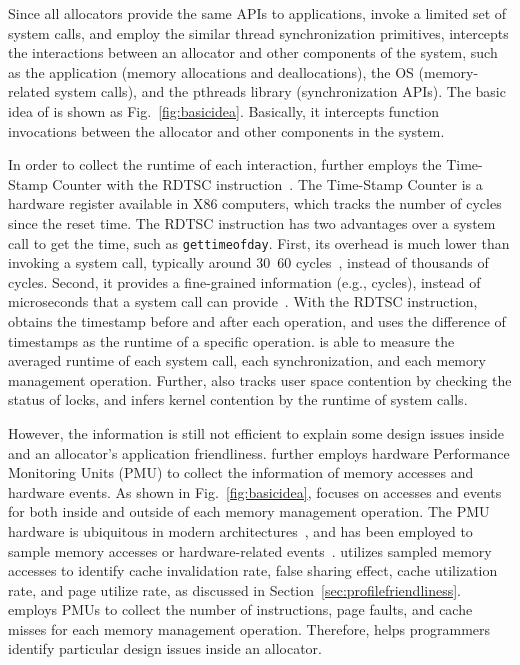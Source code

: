 Since all allocators provide the same APIs to applications, invoke a limited set of system calls, and employ the similar thread synchronization primitives, \MP{} intercepts the interactions between an allocator and other components of the system, such as the application (memory allocations and deallocations), the OS (memory-related system calls), and the pthreads library (synchronization APIs). The basic idea of \MP{} is shown as Fig.~\ref{fig:basicidea}. Basically, it intercepts function invocations between the allocator and other components in the system.
 
In order to collect the runtime of each interaction, \MP{} further employs the Time-Stamp Counter with the RDTSC instruction~\cite{coorporation1997using}. The Time-Stamp Counter is a hardware register available in X86 computers, which tracks the number of cycles since the reset time. The RDTSC instruction has two advantages over a system call to get the time, such as \texttt{gettimeofday}. First, its overhead is much lower than invoking a system call, typically around 30~60  cycles~\cite{rdtscoverhead}, instead of thousands of cycles. Second, it provides a fine-grained information (e.g., cycles), instead of microseconds that a system call can provide~\cite{pitfallsrdtsc}. With the RDTSC instruction, \MP{} obtains the timestamp before and after each operation, and uses the difference of timestamps as the runtime of a specific operation. \MP{} is able to measure the averaged runtime of each system call, each synchronization, and each memory management operation. Further, \MP{} also tracks user space contention by checking the status of locks, and infers kernel contention by the runtime of system calls. 

However, the information is still not efficient to explain some design issues inside and an allocator's application friendliness. \MP{} further employs hardware Performance Monitoring Units (PMU) to collect the information of memory accesses and hardware events. As shown in Fig.~\ref{fig:basicidea}, \MP{} focuses on accesses and events for both inside and outside of each memory management operation. The PMU hardware is ubiquitous in modern architectures~\cite{AMDIBS:07, IntelArch:PEBS:Sept09, armpmu}, and has been  employed to sample memory accesses or hardware-related events~\cite{DBLP:conf/sc/ItzkowitzWAK03, ibs-sc, Sheng:2011:RLN:1985793.1985848}.
\MP{} utilizes sampled memory accesses to identify cache invalidation rate, false sharing effect, cache utilization rate, and page utilize rate, as discussed in Section~\ref{sec:profilefriendliness}. \MP{} employs PMUs to collect the number of instructions, page faults, and cache misses for each memory management operation. Therefore, \MP{} helps programmers identify particular design issues inside an allocator. 

